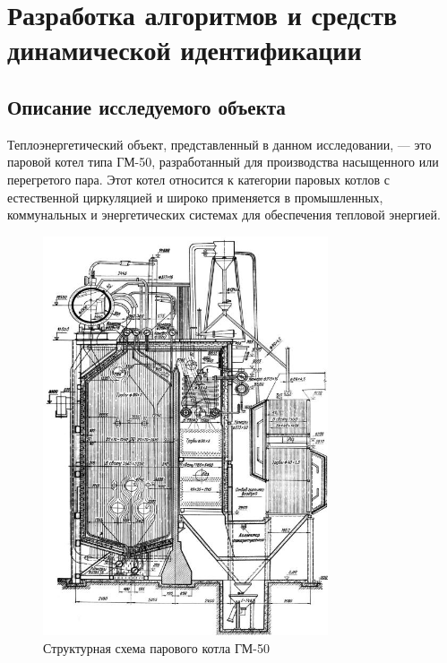 \chapter{Разработка алгоритмов и средств динамической идентификации}
 
\section{Описание исследуемого объекта}

Теплоэнергетический объект, представленный в данном исследовании, — это паровой котел типа ГМ-50, разработанный для производства насыщенного или перегретого пара. Этот котел относится к категории паровых котлов с естественной циркуляцией и широко применяется в промышленных, коммунальных и энергетических системах для обеспечения тепловой энергией. 

\begin{figure}[H]
  \begin{center}
    \includegraphics[width=0.75\textwidth]{figures/gm-50.jpg}
  \end{center}
  \caption{Структурная схема парового котла ГМ-50}\label{fig:gm50}
\end{figure}


